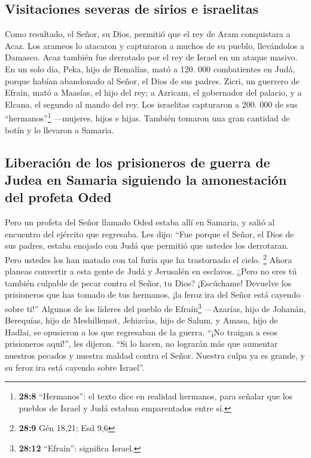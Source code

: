 \hypertarget{visitaciones-severas-de-sirios-e-israelitas}{%
\subsection{Visitaciones severas de sirios e
israelitas}\label{visitaciones-severas-de-sirios-e-israelitas}}

 Como resultado, el Señor, su Dios, permitió que el rey de
Aram conquistara a Acaz. Los arameos lo atacaron y capturaron a muchos
de su pueblo, llevándolos a Damasco. Acaz también fue derrotado por el
rey de Israel en un ataque masivo.  En un solo día, Peka,
hijo de Remalías, mató a 120. 000 combatientes en Judá, porque habían
abandonado al Señor, el Dios de sus padres.  Zicri, un
guerrero de Efraín, mató a Maasías, el hijo del rey; a Azricam, el
gobernador del palacio, y a Elcana, el segundo al mando del rey.
 Los israelitas capturaron a 200. 000 de sus
``hermanos''\footnote{\textbf{28:8} ``Hermanos'': el texto dice en
  realidad hermanos, para señalar que los pueblos de Israel y Judá
  estaban emparentados entre sí.} ---mujeres, hijos e hijas. También
tomaron una gran cantidad de botín y lo llevaron a Samaria.

\hypertarget{liberaciuxf3n-de-los-prisioneros-de-guerra-de-judea-en-samaria-siguiendo-la-amonestaciuxf3n-del-profeta-oded}{%
\subsection{Liberación de los prisioneros de guerra de Judea en Samaria
siguiendo la amonestación del profeta
Oded}\label{liberaciuxf3n-de-los-prisioneros-de-guerra-de-judea-en-samaria-siguiendo-la-amonestaciuxf3n-del-profeta-oded}}

 Pero un profeta del Señor llamado Oded estaba allí en
Samaria, y salió al encuentro del ejército que regresaba. Les dijo:
``Fue porque el Señor, el Dios de sus padres, estaba enojado con Judá
que permitió que ustedes los derrotaran. Pero ustedes los han matado con
tal furia que ha trastornado el cielo. \footnote{\textbf{28:9} Gén
  18,21; Esd 9,6}  Ahora planeas convertir a esta gente
de Judá y Jerusalén en esclavos. ¿Pero no eres tú también culpable de
pecar contra el Señor, tu Dios?  ¡Escúchame! Devuelve los
prisioneros que has tomado de tus hermanos, ¡la feroz ira del Señor está
cayendo sobre ti!''  Algunos de los líderes del pueblo de
Efraín\footnote{\textbf{28:12} ``Efraín'': significa Israel.}
---Azarías, hijo de Johanán, Berequías, hijo de Meshillemot, Jehizcías,
hijo de Salum, y Amasa, hijo de Hadlai, se opusieron a los que
regresaban de la guerra.  ``¡No traigan a esos
prisioneros aquí!'', les dijeron. ``Si lo hacen, no lograrán más que
aumentar nuestros pecados y nuestra maldad contra el Señor. Nuestra
culpa ya es grande, y su feroz ira está cayendo sobre Israel''.

